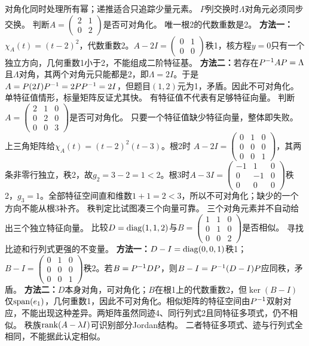 {对角化同时处理所有幂；递推适合只追踪少量元素。}
{$P$列交换时$\Lambda$对角元必须同步交换。}
{判断$A=\begin{pmatrix}2&1\\0&2\end{pmatrix}$是否可对角化。}
{唯一根2的代数重数是2。}
{\textbf{方法一：}$\chi_A(t)=(t-2)^2$，代数重数2。$A-2I=\begin{pmatrix}0&1\\0&0\end{pmatrix}$秩1，核方程$y=0$只有一个独立方向，几何重数1小于2，不能组成二阶特征基。
\textbf{方法二：}若存在$P^{-1} AP=\Lambda$且$\Lambda$对角，其两个对角元只能都是2，即$\Lambda=2I$。于是$A=P(2I)P^{-1}=2PP^{-1}=2I$，但题目$(1,2)$元为1，矛盾。因此不可对角化。}
{单特征值情形，标量矩阵反证尤其快。}
{有特征值不代表有足够特征向量。}
{判断$A=\begin{pmatrix}2&1&0\\0&2&0\\0&0&3\end{pmatrix}$是否可对角化。}
{只要一个特征值缺少特征向量，整体即失败。}
{上三角矩阵给$\chi_A(t)=(t-2)^2(t-3)$。根2时
$A-2I=\begin{pmatrix}0&1&0\\0&0&0\\0&0&1\end{pmatrix}$，其两条非零行独立，秩2，故$g_2=3-2=1<2$。根3时$A-3I=\begin{pmatrix}-1&1&0\\0&-1&0\\0&0&0\end{pmatrix}$秩2，$g_3=1$。全部特征空间直和维数$1+1=2<3$，所以不可对角化；缺少的一个方向不能从根3补齐。}
{秩判定比试图凑三个向量可靠。}
{三个对角元素并不自动给出三个独立特征向量。}
{比较$D=\operatorname{diag}(1,1,2)$与$B=\begin{pmatrix}1&1&0\\0&1&0\\0&0&2\end{pmatrix}$是否相似。}
{寻找比迹和行列式更强的不变量。}
{\textbf{方法一：}$D-I=\operatorname{diag}(0,0,1)$秩1；$B-I=\begin{pmatrix}0&1&0\\0&0&0\\0&0&1\end{pmatrix}$秩2。若$B=P^{-1} DP$，则$B-I=P^{-1}(D-I)P$应同秩，矛盾。
\textbf{方法二：}$D$本身对角，可对角化；$B$在根1上的代数重数2，但$\ker(B-I)$仅$\operatorname{span}(e_1)$，几何重数1，因此不可对角化。相似矩阵的特征空间由$P^{-1}$双射对应，不能出现这种差异。两矩阵虽然同迹4、同行列式2且同特征多项式，仍不相似。}
{秩族$\operatorname{rank}(A-\lambda I)$可识别部分Jordan结构。}
{二者特征多项式、迹与行列式全相同，不能据此认定相似。}
